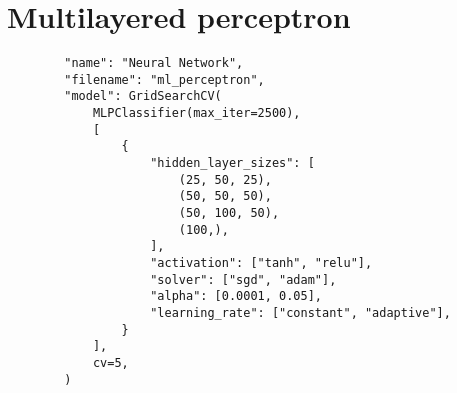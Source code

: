 \section{Multilayered perceptron}
\begin{verbatim}
        "name": "Neural Network",
        "filename": "ml_perceptron",
        "model": GridSearchCV(
            MLPClassifier(max_iter=2500),
            [
                {
                    "hidden_layer_sizes": [
                        (25, 50, 25),
                        (50, 50, 50),
                        (50, 100, 50),
                        (100,),
                    ],
                    "activation": ["tanh", "relu"],
                    "solver": ["sgd", "adam"],
                    "alpha": [0.0001, 0.05],
                    "learning_rate": ["constant", "adaptive"],
                }
            ],
            cv=5,
        )
\end{verbatim}
